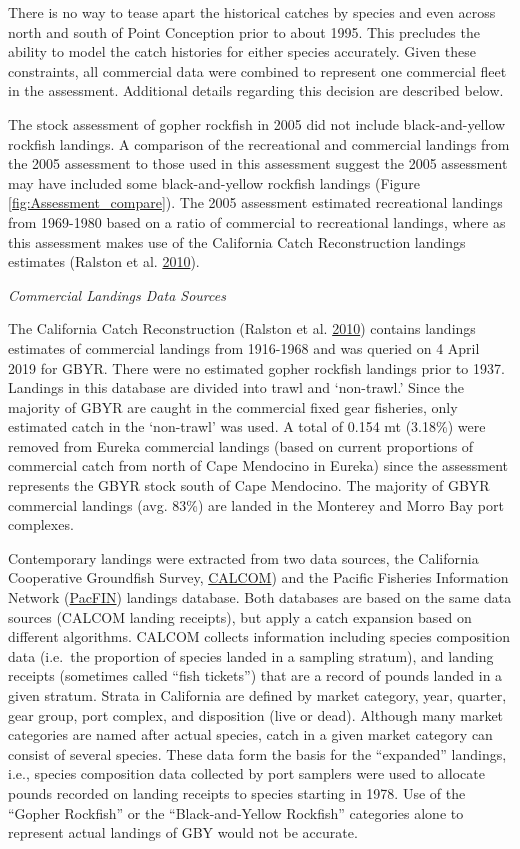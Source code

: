 \documentclass[12pt,]{article}
\begin{document}
There is no way to tease apart the historical catches by species and
even across north and south of Point Conception prior to about 1995.
This precludes the ability to model the catch histories for either
species accurately. Given these constraints, all commercial data were
combined to represent one commercial fleet in the assessment. Additional
details regarding this decision are described below.

The stock assessment of gopher rockfish in 2005 did not include
black-and-yellow rockfish landings. A comparison of the recreational and
commercial landings from the 2005 assessment to those used in this
assessment suggest the 2005 assessment may have included some
black-and-yellow rockfish landings (Figure
\ref{fig:Assessment_compare}). The 2005 assessment estimated
recreational landings from 1969-1980 based on a ratio of commercial to
recreational landings, where as this assessment makes use of the
California Catch Reconstruction landings estimates (Ralston et al.
\protect\hyperlink{ref-Ralston2010}{2010}).

\emph{Commercial Landings Data Sources}

The California Catch Reconstruction (Ralston et al.
\protect\hyperlink{ref-Ralston2010}{2010}) contains landings estimates
of commercial landings from 1916-1968 and was queried on 4 April 2019
for GBYR. There were no estimated gopher rockfish landings prior to
1937. Landings in this database are divided into trawl and `non-trawl.'
Since the majority of GBYR are caught in the commercial fixed gear
fisheries, only estimated catch in the `non-trawl' was used. A total of
0.154 mt (3.18\%) were removed from Eureka commercial landings (based on
current proportions of commercial catch from north of Cape Mendocino in
Eureka) since the assessment represents the GBYR stock south of Cape
Mendocino. The majority of GBYR commercial landings (avg. 83\%) are
landed in the Monterey and Morro Bay port complexes.

Contemporary landings were extracted from two data sources, the
California Cooperative Groundfish Survey,
\href{https://calcom.psmfc.org/}{CALCOM}) and the Pacific Fisheries
Information Network (\href{https://pacfin.psmfc.org/}{PacFIN}) landings
database. Both databases are based on the same data sources (CALCOM
landing receipts), but apply a catch expansion based on different
algorithms. CALCOM collects information including species composition
data (i.e.~the proportion of species landed in a sampling stratum), and
landing receipts (sometimes called ``fish tickets'') that are a record
of pounds landed in a given stratum. Strata in California are defined by
market category, year, quarter, gear group, port complex, and
disposition (live or dead). Although many market categories are named
after actual species, catch in a given market category can consist of
several species. These data form the basis for the ``expanded''
landings, i.e., species composition data collected by port samplers were
used to allocate pounds recorded on landing receipts to species starting
in 1978. Use of the ``Gopher Rockfish'' or the ``Black-and-Yellow
Rockfish'' categories alone to represent actual landings of GBY would
not be accurate.
\end{document}
